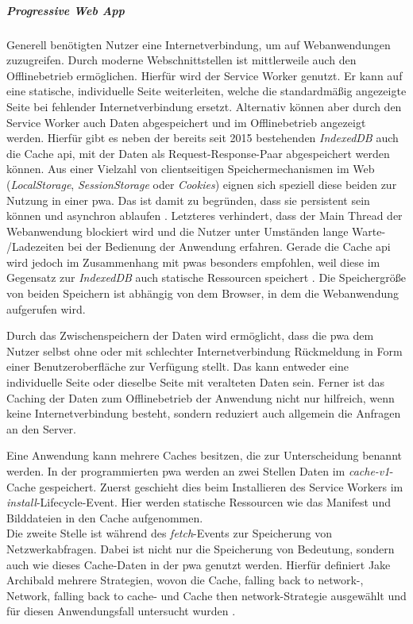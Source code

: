 \subparagraph{Progressive Web App\\}
Generell benötigten Nutzer eine Internetverbindung, um auf Webanwendungen zuzugreifen.
Durch moderne Webschnittstellen ist mittlerweile auch den Offlinebetrieb ermöglichen.
Hierfür wird der Service Worker genutzt.
Er kann auf eine statische, individuelle Seite weiterleiten, welche die standardmäßig angezeigte Seite bei fehlender Internetverbindung ersetzt.
Alternativ können aber durch den Service Worker auch Daten abgespeichert und im Offlinebetrieb angezeigt werden.
Hierfür gibt es neben der bereits seit 2015 bestehenden \textit{IndexedDB} auch die Cache \ac{api}, mit der Daten als Request-Response-Paar abgespeichert werden können.
Aus einer Vielzahl von clientseitigen Speichermechanismen im Web (\textit{LocalStorage}, \textit{SessionStorage} oder \textit{Cookies}) eignen sich speziell diese beiden zur Nutzung in einer \ac{pwa}.
Das ist damit zu begründen, dass sie persistent sein können und asynchron ablaufen \cite{LePage.2020}.
Letzteres verhindert, dass der Main Thread der Webanwendung blockiert wird und die Nutzer unter Umständen lange Warte- /Ladezeiten bei der Bedienung der Anwendung erfahren.
Gerade die Cache \ac{api} wird jedoch im Zusammenhang mit \acp{pwa} besonders empfohlen, weil diese im Gegensatz zur \textit{IndexedDB} auch statische Ressourcen speichert \cite{MDNcontributors.o.J.}.
Die Speichergröße von beiden Speichern ist abhängig von dem Browser, in dem die Webanwendung aufgerufen wird.

Durch das Zwischenspeichern der Daten wird ermöglicht, dass die \ac{pwa} dem Nutzer selbst ohne oder mit schlechter Internetverbindung Rückmeldung in Form einer Benutzeroberfläche zur Verfügung stellt.
Das kann entweder eine individuelle Seite oder dieselbe Seite mit veralteten Daten sein.
Ferner ist das Caching der Daten zum Offlinebetrieb der Anwendung nicht nur hilfreich, wenn keine Internetverbindung besteht, sondern reduziert auch allgemein die Anfragen an den Server. %

Eine Anwendung kann mehrere Caches besitzen, die zur Unterscheidung benannt werden.
In der programmierten \ac{pwa} werden an zwei Stellen Daten im \textit{cache-v1}-Cache gespeichert.
Zuerst geschieht dies beim Installieren des Service Workers im \textit{install}-Lifecycle-Event.
Hier werden statische Ressourcen wie das Manifest und Bilddateien in den Cache aufgenommen.\\
Die zweite Stelle ist während des \textit{fetch}-Events zur Speicherung von Netzwerkabfragen.
Dabei ist nicht nur die Speicherung von Bedeutung, sondern auch wie dieses Cache-Daten in der \ac{pwa} genutzt werden.
Hierfür definiert Jake Archibald mehrere Strategien, wovon die \glqq Cache, falling back to network\grqq{}-, \glqq Network, falling back to cache\grqq{}- und \glqq Cache then network\grqq{}-Strategie ausgewählt und für diesen Anwendungsfall untersucht wurden \cite{Archibald.2020}.

